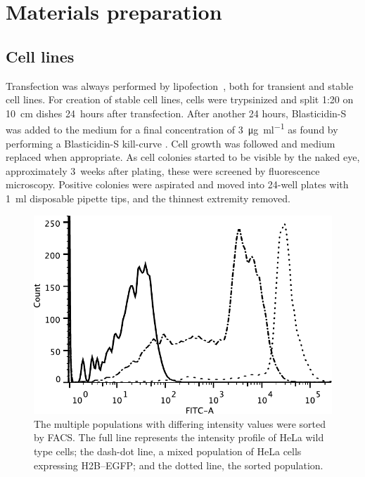 \section{Materials preparation}

  \subsection{Cell lines}

    Transfection was always performed by lipofection~,
    both for transient and stable cell lines. For creation of stable cell lines,
    cells were trypsinized and split 1:20 on \SI{10}{\cm} dishes 24~hours after transfection.
    After another 24 hours, Blasticidin-S was added to the medium for
    a final concentration of \SI{3}{\ug\per\ml} as found by performing a
    Blasticidin-S kill-curve .
    Cell growth was followed and medium replaced when appropriate.
    As cell colonies started to be visible by the naked eye, approximately
    3~weeks after plating, these were screened by fluorescence microscopy.
    Positive colonies were aspirated and moved into 24-well plates with
    \SI{1}{\ml} disposable pipette tips, and the thinnest extremity removed.

    \begin{figure}
      \centering
      \includegraphics[width=\textwidth]{figs/facs-stable-cell-lines.pdf}
        {
          The multiple populations with differing intensity values were
          sorted by FACS. The full line represents the intensity profile
          of HeLa wild type cells; the dash-dot line, a mixed population
          of HeLa cells expressing H2B--EGFP; and the dotted line, the
          sorted population.
        }
      \label{fig:methods:facs}
    \end{figure}

